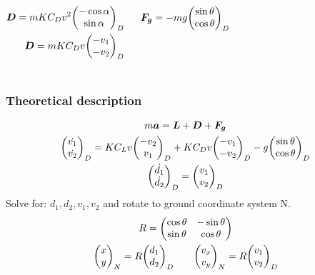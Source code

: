 \documentclass{beamer}
\begin{document}
\begin{frame}
\begin{columns}[onlytextwidth]
\begin{gather}
\begin{split}
\bm D = m K C_D v^2 \mqty(-\cos \alpha \\ \sin \alpha)_D\\
\bm D = m K C_D v \mqty(-v_1 \\ -v_2\\)_D
\end{split}
\end{gather}

\begin{gather}
\begin{split}
\bm F_{\bm g} = - m g  \mqty(\sin \theta \\ \cos \theta)_D
\end{split}
\end{gather}

\end{columns}

\end{frame}


\begin{frame}

\frametitle{Theoretical description}

\begin{gather}
m \bm a = \bm L + \bm D + \bm F_{\bm g}\\
\mqty( \dot{v_1} \\ \dot{v_2}\\)_D = K  C_L v \mqty(-v_2 \\ v_1\\)_D + K C_D v \mqty(-v_1 \\ -v_2\\)_D - g  \mqty(\sin \theta \\ \cos \theta)_D\\
\mqty( \dot{d_1} \\ \dot{d_2}\\)_D = \mqty( v_1 \\v_2\\)_D
\end{gather}
Solve for: $d_1, d_2, v_1, v_2 $ and rotate to ground coordinate system N.
\begin{gather}
R = \mqty(\cos \theta & -\sin \theta \\ \sin \theta & \cos \theta)\\
\mqty(x \\ y)_N = R \mqty(d_1 \\ d_2)_D \qquad \mqty(v_x \\ v_y)_N = R \mqty(v_1 \\ v_2)_D
\end{gather}
\end{frame}
\end{document}
